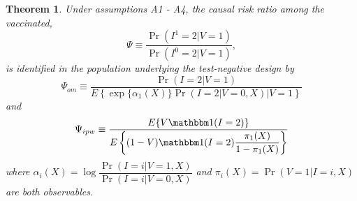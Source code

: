 \documentclass{article}
\newtheorem{theorem}{Theorem}
\begin{document}
\begin{theorem}
Under assumptions A1 - A4, the causal risk ratio among the vaccinated, 
\begin{equation*}
    \Psi \equiv \dfrac{\Pr(I^1=2|V=1)}{\Pr(I^0=2|V=1)},
\end{equation*}
is identified in the population underlying the test-negative design by 
\begin{equation}
    \Psi_{om} \equiv \dfrac{\Pr(I = 2 | V = 1)}{E\left\{ \exp\{\alpha_1(X)\} \Pr(I = 2 | V = 0, X) \Big| V = 1 \right\}}
\end{equation}
and 
\begin{equation}
    \Psi_{ipw} \equiv \dfrac{E\{V \mathbbm 1 (I = 2)\}}{E\left\{ (1 - V) \mathbbm 1(I = 2) \dfrac{\pi_1(X)}{1 - \pi_1(X)}\right\}}
\end{equation}
where $\alpha_i(X) = \log \dfrac{\Pr(I =i | V = 1, X)}{\Pr(I =i | V = 0, X)}$ and $\pi_i(X) = \Pr(V = 1 | I = i, X)$ are both observables. 
\end{theorem}
\end{document}
